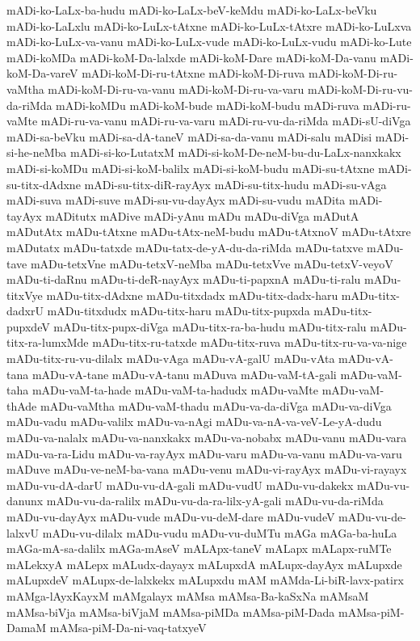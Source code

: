 {mADi-ko-LaLx-ba-hudu
mADi-ko-LaLx-beV-keMdu
mADi-ko-LaLx-beVku
mADi-ko-LaLxlu
mADi-ko-LuLx-tAtxne
mADi-ko-LuLx-tAtxre
mADi-ko-LuLxva
mADi-ko-LuLx-va-vanu
mADi-ko-LuLx-vude
mADi-ko-LuLx-vudu
mADi-ko-Lute
mADi-koMDa
mADi-koM-Da-lalxde
mADi-koM-Dare
mADi-koM-Da-vanu
mADi-koM-Da-vareV
mADi-koM-Di-ru-tAtxne
mADi-koM-Di-ruva
mADi-koM-Di-ru-vaMtha
mADi-koM-Di-ru-va-vanu
mADi-koM-Di-ru-va-varu
mADi-koM-Di-ru-vu-da-riMda
mADi-koMDu
mADi-koM-bude
mADi-koM-budu
mADi-ruva
mADi-ru-vaMte
mADi-ru-va-vanu
mADi-ru-va-varu
mADi-ru-vu-da-riMda
mADi-sU-diVga
mADi-sa-beVku
mADi-sa-dA-taneV
mADi-sa-da-vanu
mADi-salu
mADisi
mADi-si-he-neMba
mADi-si-ko-LutatxM
mADi-si-koM-De-neM-bu-du-LaLx-nanxkakx
mADi-si-koMDu
mADi-si-koM-balilx
mADi-si-koM-budu
mADi-su-tAtxne
mADi-su-titx-dAdxne
mADi-su-titx-diR-rayAyx
mADi-su-titx-hudu
mADi-su-vAga
mADi-suva
mADi-suve
mADi-su-vu-dayAyx
mADi-su-vudu
mADita
mADi-tayAyx
mADitutx
mADive
mADi-yAnu
mADu
mADu-diVga
mADutA
mADutAtx
mADu-tAtxne
mADu-tAtx-neM-budu
mADu-tAtxnoV
mADu-tAtxre
mADutatx
mADu-tatxde
mADu-tatx-de-yA-du-da-riMda
mADu-tatxve
mADu-tave
mADu-tetxVne
mADu-tetxV-neMba
mADu-tetxVve
mADu-tetxV-veyoV
mADu-ti-daRnu
mADu-ti-deR-nayAyx
mADu-ti-papxnA
mADu-ti-ralu
mADu-titxVye
mADu-titx-dAdxne
mADu-titxdadx
mADu-titx-dadx-haru
mADu-titx-dadxrU
mADu-titxdudx
mADu-titx-haru
mADu-titx-pupxda
mADu-titx-pupxdeV
mADu-titx-pupx-diVga
mADu-titx-ra-ba-hudu
mADu-titx-ralu
mADu-titx-ra-lumxMde
mADu-titx-ru-tatxde
mADu-titx-ruva
mADu-titx-ru-va-va-nige
mADu-titx-ru-vu-dilalx
mADu-vAga
mADu-vA-galU
mADu-vAta
mADu-vA-tana
mADu-vA-tane
mADu-vA-tanu
mADuva
mADu-vaM-tA-gali
mADu-vaM-taha
mADu-vaM-ta-hade
mADu-vaM-ta-hadudx
mADu-vaMte
mADu-vaM-thAde
mADu-vaMtha
mADu-vaM-thadu
mADu-va-da-diVga
mADu-va-diVga
mADu-vadu
mADu-valilx
mADu-va-nAgi
mADu-va-nA-va-veV-Le-yA-dudu
mADu-va-nalalx
mADu-va-nanxkakx
mADu-va-nobabx
mADu-vanu
mADu-vara
mADu-va-ra-Lidu
mADu-va-rayAyx
mADu-varu
mADu-va-vanu
mADu-va-varu
mADuve
mADu-ve-neM-ba-vana
mADu-venu
mADu-vi-rayAyx
mADu-vi-rayayx
mADu-vu-dA-darU
mADu-vu-dA-gali
mADu-vudU
mADu-vu-dakekx
mADu-vu-danunx
mADu-vu-da-ralilx
mADu-vu-da-ra-lilx-yA-gali
mADu-vu-da-riMda
mADu-vu-dayAyx
mADu-vude
mADu-vu-deM-dare
mADu-vudeV
mADu-vu-de-lalxvU
mADu-vu-dilalx
mADu-vudu
mADu-vu-duMTu
mAGa
mAGa-ba-huLa
mAGa-mA-sa-dalilx
mAGa-mAseV
mALApx-taneV
mALapx
mALapx-ruMTe
mALekxyA
mALepx
mALudx-dayayx
mALupxdA
mALupx-dayAyx
mALupxde
mALupxdeV
mALupx-de-lalxkekx
mALupxdu
mAM
mAMda-Li-biR-lavx-patirx
mAMga-lAyxKayxM
mAMgalayx
mAMsa
mAMsa-Ba-kaSxNa
mAMsaM
mAMsa-biVja
mAMsa-biVjaM
mAMsa-piMDa
mAMsa-piM-Dada
mAMsa-piM-DamaM
mAMsa-piM-Da-ni-vaq-tatxyeV
}
